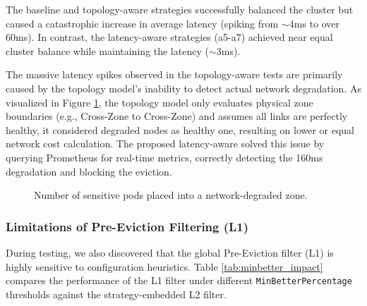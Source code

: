 The baseline and topology-aware strategies successfully balanced the cluster but caused a catastrophic increase in average latency (spiking from $\sim$4ms to over 60ms). In contrast, the latency-aware strategies (a5-a7) achieved near equal cluster balance while maintaining the latency ($\sim$3ms).

The massive latency spikes observed in the topology-aware tests are primarily caused by the topology model's inability to detect actual network degradation. As visualized in Figure \ref{fig:topology_flaw}, the topology model only evaluates physical zone boundaries (e.g., Cross-Zone to Cross-Zone) and assumes all links are perfectly healthy, it considered degraded nodes as healthy one, resulting on lower or equal network cost calculation. The proposed latency-aware solved this issue by querying Prometheus for real-time metrics, correctly detecting the 160ms degradation and blocking the eviction.

\begin{figure}[tbp]
    \centering
    \caption{Number of sensitive pods placed into a network-degraded zone.}
    \label{fig:topology_flaw}
\end{figure}


\subsubsection{Limitations of Pre-Eviction Filtering (L1)}
\label{subsubsec:netaware4_resultanalysis1_limitation}


During testing, we also discovered that the global Pre-Eviction filter (L1) is highly sensitive to configuration heuristics. Table \ref{tab:minbetter_impact} compares the performance of the L1 filter under different \texttt{MinBetterPercentage} thresholds against the strategy-embedded L2 filter.

